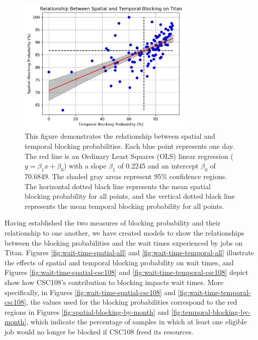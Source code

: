 \begin{figure}
  \includegraphics[width=0.75\textwidth]{images/linfit-spatial-vs-temporal-by-day.png}
\caption{This figure demonstrates the relationship between spatial and temporal
blocking probabilities. Each blue point represents one day. The red line is an
Ordinary Least Squares (OLS) linear regression ($y = \beta_{1}x + \beta_0$)
with a slope $\beta_1$ of 0.2245 and an intercept $\beta_0$ of 70.6849. The
shaded gray areas represent 95\% confidence regions. The horizontal dotted
black line represents the mean spatial blocking probability for all points, and
the vertical dotted black line represents the mean temporal blocking
probability for all points.}
\label{fig:spatial-vs-temporal}
\end{figure}


Having established the two measures of blocking probability and their
relationship to one another, we have created models to show the relationships
between the blocking probabilities and the wait times experienced by jobs on
Titan. Figures \ref{fig:wait-time-spatial-all} and
\ref{fig:wait-time-temporal-all} illustrate the effects of spatial and temporal
blocking probability on wait times, and Figures
\ref{fig:wait-time-spatial-csc108} and \ref{fig:wait-time-temporal-csc108}
depict show how CSC108's contribution to blocking impacts wait times. More
specifically, in Figures
\ref{fig:wait-time-spatial-csc108} and \ref{fig:wait-time-temporal-csc108},
the values used for the blocking probabilities correspond to the red regions
in Figures \ref{fig:spatial-blocking-by-month} and
\ref{fig:temporal-blocking-by-month}, which indicate the percentage of samples
in which at least one eligible job would no longer be blocked if CSC108 freed
its resources.

